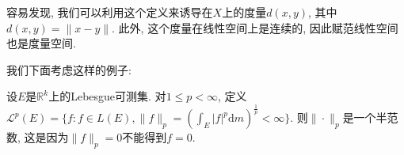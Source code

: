 \documentclass[theorem=false,mathfont=none,openany,sub3section]{easybook}
\begin{document}
\begin{remark}
  容易发现, 我们可以利用这个定义来诱导在$X$上的度量$d(x,y)$, 其中$d(x,y) = \|x-y\|$. 此外, 这个度量在线性空间上是连续的, 因此赋范线性空间也是度量空间.\par
\end{remark}

我们下面考虑这样的例子:\par

\begin{example}
  设$E$是$\mathbb{R}^k$上的Lebesgue可测集. 对$1\leqslant p <\infty$, 定义$\mathcal{L}^p(E)=\{f: f\in L(E), \|f\|_p=\left(\int_{E}|f|^p \mathrm{d}m\right)^{\frac{1}{p}} < \infty\}$. 则$\|\cdot\|_p$是一个半范数, 这是因为$\|f\|_p=0$不能得到$f=0$.\par
\end{example}

\backmatter
\end{document}
